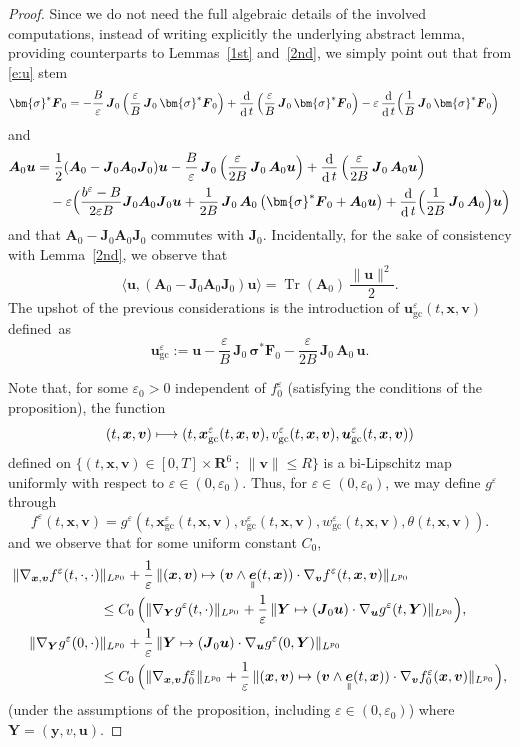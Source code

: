 \documentclass[JEP,XML,SOM,Unicode]{cedram}
\newcommand\mto{\mathchoice{\longmapsto}{\mapsto}{\mapsto}{\mapsto}}
\newcommand{\sep}{\ ;\ }
\let\eps\varepsilon
\DeclareMathOperator\dD{d}\let\dd\dD
\DeclareMathOperator{\Tr}{Tr}
\theoremstyle{plain}
\theoremstyle{definition}
\newcommand{\be}{\begin{equation}}
\newcommand{\ee}{\end{equation}}
\newcommand\R{\mathbf R}
\newcommand\bA{{\boldsymbol A}}
\newcommand\bF{{\boldsymbol F}}
\newcommand\bJ{{\boldsymbol J}}
\newcommand\bY{{\boldsymbol Y}}
\newcommand\bfu{{\boldsymbol u}}
\newcommand\bfv{{\boldsymbol v}}
\newcommand\bfx{{\boldsymbol x}}
\newcommand\bfy{{\boldsymbol y}}
\newcommand\bfsigma{\bm{\sigma}}
\DeclareMathOperator{\beD}{\boldsymbol{e}}
\newcommand\eDpar{\beD_\mypar}
\newcommand{\GC}{\bfx_\mathrm{gc}}
\newcommand{\eGC}{w_\mathrm{gc}}
\newcommand{\vGC}{v_\mathrm{gc}}
\newcommand{\uGC}{\bfu_\mathrm{gc}}
\newcommand{\mypar}{{\mkern3mu\vphantom{\perp}\vrule depth 0pt\mkern2mu\vrule depth 0pt\mkern3mu}}
\begin{document}
\begin{proof}
Since we do not need the full algebraic details of the involved computations, instead of writing explicitly the underlying abstract lemma, providing counterparts to Lemmas~\ref{1st} and~\ref{2nd}, we simply point out that from \eqref{e:u} stem
\begin{align*}
\bfsigma^*\bF_0
&=-\frac{B}{\eps}\, \bJ_0\left(\frac{\eps}{B}\,\bJ_0\,\bfsigma^*\bF_0\right)
+\frac{\dD}{\dD t}\left(\frac{\eps}{B}\,\bJ_0\,\bfsigma^*\bF_0\right)
-\eps\,\frac{\dD}{\dD t}\Bigl(\frac{1}{B}\,\bJ_0\,\bfsigma^*\bF_0\Bigr)
\end{align*}
and
\begin{align*}
\bA_0\bfu
&=\frac12(\bA_0-\bJ_0\bA_0\bJ_0)\bfu
-\frac{B}{\eps}\, \bJ_0\left(\frac{\eps}{2B}\,\bJ_0\,\bA_0\bfu\right)
+\frac{\dD}{\dD t}\left(\frac{\eps}{2B}\,\bJ_0\,\bA_0\bfu\right)\\
&\quad
-\eps\Bigl(\frac{b^\eps-B}{2\eps B}\bJ_0\bA_0\bJ_0\bfu
+\frac{1}{2B}\,\bJ_0\,\bA_0\left(\bfsigma^*\bF_0+\bA_0\bfu\right)
+\frac{\dD}{\dD t}\Bigl(\frac{1}{2B}\,\bJ_0\,\bA_0\Bigr)\bfu\Bigr)
\end{align*}
and that $\bA_0-\bJ_0\bA_0\bJ_0$ commutes with $\bJ_0$. Incidentally, for the sake of consistency with Lemma~\ref{2nd}, we observe that\enlargethispage{\baselineskip}%
\[
\langle\bfu,(\bA_0-\bJ_0\bA_0\bJ_0)\bfu\rangle
=\Tr(\bA_0)\,\frac{\|\bfu\|^2}{2}.
\]
The upshot of the previous considerations is the introduction of $\uGC^\eps(t,\bfx,\bfv)$ defined~as%
\be\label{def:uGC}
\uGC^\eps
:=\bfu-\frac{\eps}{B}\,\bJ_0\,\bfsigma^*\bF_0-\frac{\eps}{2B}\,\bJ_0\,\bA_0\,\bfu.
\ee

Note that, for some $\eps_0>0$ independent of $f_0^\eps$ (satisfying the conditions of the proposition), the function
\[
(t,\bfx,\bfv)\mto (t,\GC^\eps(t,\bfx,\bfv),\vGC^\eps(t,\bfx,\bfv),\uGC^\eps(t,\bfx,\bfv))
\]
defined on $\{(t,\bfx,\bfv)\in[0,T]\times\R^6\sep \|\bfv\|\leq R\}$ is a bi-Lipschitz map uniformly with respect to $\eps\in(0,\eps_0)$. Thus, for $\eps\in(0,\eps_0)$, we may define $g^\eps$ through
\[
f^\eps(t,\bfx,\bfv)=g^\eps(t,\GC^\eps(t,\bfx,\bfv),\vGC^\eps(t,\bfx,\bfv),\eGC^\eps(t,\bfx,\bfv),\theta(t,\bfx,\bfv)).
\]
and we observe that for some uniform constant $C_0$,
\begin{align*}
\|\nabla_{\bfx,\bfv}f^\eps(t,\cdot,\cdot)&\|_{L^{p_0}}
+\frac{1}{\eps}\,\|(\bfx,\bfv)\mapsto (\bfv\wedge\eDpar(t,\bfx))\cdot\nabla_{\bfv}f^\eps(t,\bfx,\bfv)\|_{L^{p_0}}\\
&\leq
C_0\,\Bigl(
\|\nabla_{\bY}g^\eps(t,\cdot)\|_{L^{p_0}}
+\frac{1}{\eps}\,\|
\bY\mapsto (\bJ_0\bfu)\cdot\nabla_{\bfu}g^\eps(t,\bY)\|_{L^{p_0}}\Bigr),\\
\|\nabla_{\bY}g^\eps(0,\cdot)&\|_{L^{p_0}}
+\frac{1}{\eps}\,\|\bY\mapsto (\bJ_0\bfu)\cdot\nabla_{\bfu}g^\eps(0,\bY)\|_{L^{p_0}}\\
&\leq
C_0\,\Bigl(
\|\nabla_{\bfx,\bfv}f_0^\eps\|_{L^{p_0}}
+\frac{1}{\eps}\,\|(\bfx,\bfv)\mapsto (\bfv\wedge\eDpar(t,\bfx))\cdot\nabla_{\bfv}f_0^\eps(\bfx,\bfv)\|_{L^{p_0}}\Bigr),
\end{align*}
(under the assumptions of the proposition, including $\eps\in(0,\eps_0)$)
where $\bY=(\bfy,v,\bfu)$.


\end{proof}
\end{document}
